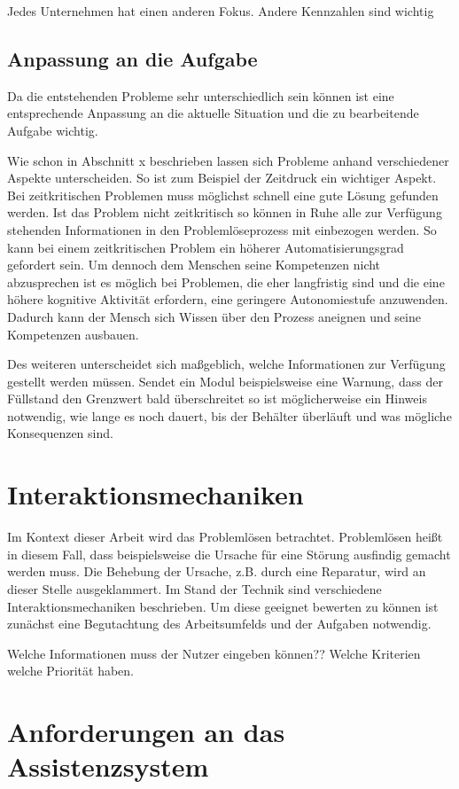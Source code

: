 Jedes Unternehmen hat einen anderen Fokus. Andere Kennzahlen sind wichtig

\subsection{Anpassung an die Aufgabe}
Da die entstehenden Probleme sehr unterschiedlich sein können ist eine entsprechende Anpassung an die aktuelle Situation und die zu bearbeitende Aufgabe wichtig.

Wie schon in Abschnitt x beschrieben lassen sich Probleme anhand verschiedener Aspekte unterscheiden. So ist zum Beispiel der Zeitdruck ein wichtiger Aspekt. Bei zeitkritischen Problemen muss möglichst schnell eine gute Lösung gefunden werden. Ist das Problem nicht zeitkritisch so können in Ruhe alle zur Verfügung stehenden Informationen in den Problemlöseprozess mit einbezogen werden. So kann bei einem zeitkritischen Problem ein höherer Automatisierungsgrad gefordert sein. Um dennoch dem Menschen seine Kompetenzen nicht abzusprechen ist es möglich bei Problemen, die eher langfristig sind und die eine höhere kognitive Aktivität erfordern, eine geringere Autonomiestufe anzuwenden. Dadurch kann der Mensch sich Wissen über den Prozess aneignen und seine Kompetenzen ausbauen. 

Des weiteren unterscheidet sich maßgeblich, welche Informationen zur Verfügung gestellt werden müssen. Sendet ein Modul beispielsweise eine Warnung, dass der Füllstand den Grenzwert bald überschreitet so ist möglicherweise ein Hinweis notwendig, wie lange es noch dauert, bis der Behälter überläuft und was mögliche Konsequenzen sind.

\section{Interaktionsmechaniken}
Im Kontext dieser Arbeit wird das Problemlösen betrachtet. Problemlösen heißt in diesem Fall, dass beispielsweise die Ursache für eine Störung ausfindig gemacht werden muss. Die Behebung der Ursache, z.B. durch eine Reparatur, wird an dieser Stelle ausgeklammert. Im Stand der Technik sind verschiedene Interaktionsmechaniken beschrieben. Um diese geeignet bewerten zu können ist zunächst eine Begutachtung des Arbeitsumfelds und der Aufgaben notwendig. 

Welche Informationen muss der Nutzer eingeben können?? Welche Kriterien welche Priorität haben. 

\section{Anforderungen an das Assistenzsystem}

